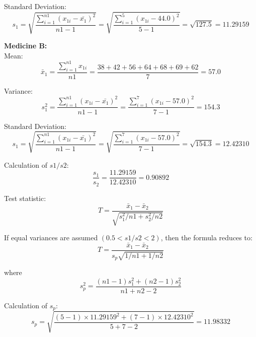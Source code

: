 \documentclass[a4paper,11pt,openright]{report}
\begin{document}
\begin{enumerate}
\hspace*{10mm} Standard Deviation:
\begin{equation*}
s_{1} = \sqrt{\frac{\sum\limits_{i=1}^{n1} (x_{1i} - \bar {x_{1}})^{2}}{n1 - 1}}
	= \sqrt{\frac{\sum\limits_{i=1}^{5} (x_{1i} - 44.0)^{2}}{5 -1}}
	= \sqrt{127.5} = 11.29159
\end{equation*}

\textbf{Medicine B:} \\
\hspace*{10mm} Mean:
\begin{equation*}
\bar x_{1} = \frac{\sum\limits_{i=1}^{n1} x_{1i}}{n1}
		= \frac{38 + 42 + 56 + 64 + 68 + 69 + 62}{7} = 57.0
\end{equation*}

\hspace*{10mm} Variance:
\begin{equation*}
s_{1}^{2} = \frac{\sum\limits_{i=1}^{n1} (x_{1i} - \bar {x_{1}})^{2}}{n1 - 1}
	= \frac{\sum\limits_{i=1}^{7} (x_{1i} - 57.0)^{2}}{7 - 1} = 154.3
\end{equation*}

\hspace*{10mm} Standard Deviation:
\begin{equation*}
s_{1} = \sqrt{\frac{\sum\limits_{i=1}^{n1} (x_{1i} - \bar {x_{1}})^{2}}{n1 - 1}}
	= \sqrt{\frac{\sum\limits_{i=1}^{7} (x_{1i} - 57.0)^{2}}{7 -1}}
	= \sqrt{154.3} = 12.42310
\end{equation*}

Calculation of $s1/s2$:
\begin{equation*}
\frac{s_{1}}{s_{2}} = \frac{11.29159}{12.42310} = 0.90892
\end{equation*}

Test statistic:
\begin{equation*}
T = \frac{\bar x_{1} - \bar x_{2}}{\sqrt{s_{1}^{2}/n1 + s_{2}^{2}/n2}}
\end{equation*}

If equal variances are assumed $(0.5 < s1/s2 < 2)$, then the formula reduces to:
\begin{equation*}
T = \frac{\bar x_{1} - \bar x_{2}}{s_{p} \sqrt{1/n1 + 1/n2}}
\end{equation*}

where
\begin{equation*}
s_{p}^{2} = \frac{(n1-1)s_{1}^{2} + (n2-1)s_{2}^{2}}{n1+n2-2}
\end{equation*}

Calculation of $s_{p}$:
\begin{equation*}
s_{p} = \sqrt{\frac{(5-1) \times 11.29159^{2} + (7-1) \times 12.42310^{2}}{5+7-2}} 
      = 11.98332
\end{equation*}


\end{enumerate}
\end{document}
